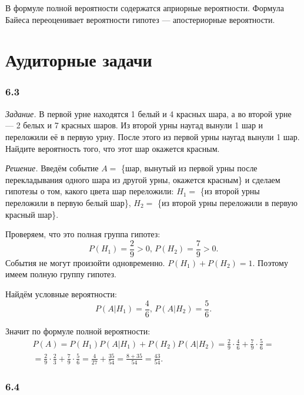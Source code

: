 В формуле полной вероятности содержатся априорные вероятности. Формула Байеса переоценивает вероятности гипотез --- апостериорные вероятности.

\section*{Аудиторные задачи}

\subsubsection*{6.3}

\textit{Задание.} В первой урне находятся 1 белый и 4 красных шара, а во второй урне --- 2 белых и 7 красных шаров.
Из второй урны наугад вынули 1 шар и переложили её в первую урну.
После этого из первой урны наугад вынули 1 шар.
Найдите вероятность того, что этот шар окажется красным.

\textit{Решение.}
Введём событие $A =$ \{шар, вынутый из первой урны после перекладывания одного шара из другой урны, окажется красным\} и сделаем гипотезы о том,
какого цвета шар переложили: $H_1 =$ \{из второй урны переложили в первую белый шар\}, $H_2 =$ \{из второй урны переложили в первую красный шар\}.

Проверяем, что это полная группа гипотез:
$$P \left( H_1 \right) =
\frac{2}{9} >
0, \,
P \left( H_2 \right) =
\frac{7}{9} >
0.$$
События не могут произойти одновременно.
$P \left( H_1 \right) + P \left( H_2 \right) =
1$.
Поэтому имеем полную группу гипотез.

Найдём условные вероятности:
$$P \left( \left. A \right| H_1 \right) =
\frac{4}{6}, \,
P \left( \left. A \right| H_2 \right) =
\frac{5}{6}.$$

Значит по формуле полной вероятности:
\begin{equation*}
\begin{split}
P \left( A \right) =
P \left( H_1 \right) P \left( \left. A \right| H_1 \right) + P \left( H_2 \right) P \left( \left. A \right| H_2 \right) =
\frac{2}{9} \cdot \frac{4}{6} + \frac{7}{9} \cdot \frac{5}{6} = \\
= \frac{2}{9} \cdot \frac{2}{3} + \frac{7}{9} \cdot \frac{5}{6} =
\frac{4}{27} + \frac{35}{54} =
\frac{8+35}{54} =
\frac{43}{54}.
\end{split}
\end{equation*}

\subsubsection*{6.4}

